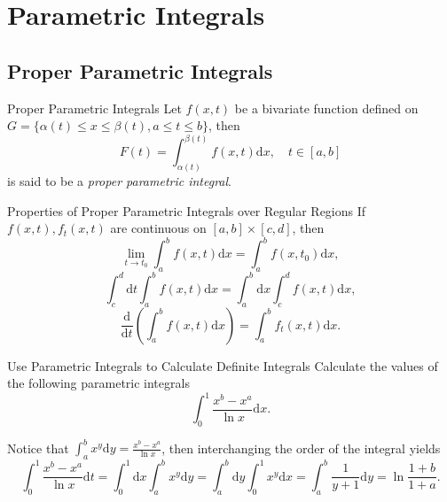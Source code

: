 
\section{Parametric Integrals}

\subsection{Proper Parametric Integrals}

\begin{definition}{Proper Parametric Integrals}{}
  Let $f(x, t)$ be a bivariate function defined on $G = \{\alpha(t) \leq x \leq
  \beta(t), a \leq t \leq b\}$,
  then
  \begin{equation}
    F(t) = \int_{\alpha(t)}^{\beta(t)} f(x, t)\mathrm{d} x, \quad t \in [a, b]
  \end{equation}
  is said to be a \emph{proper parametric integral}.
\end{definition}

\begin{proposition}{Properties of Proper Parametric Integrals over Regular Regions}{}
  If $f(x, t), f_t(x, t)$ are continuous on $[a, b] \times [c, d]$, then
  \begin{equation}
    \lim \limits _{t \rightarrow t_0} \int_a^b f(x, t)\mathrm{d} x
    = \int_a^b f(x, t_0) \mathrm{d} x,
  \end{equation}
  \begin{equation}
    \int_{c}^{d}\mathrm{d}t\int_{a}^{b}f(x,t)\mathrm{d}x=\int_{a}^{b}\mathrm{d}x\int_{c}^{d}f(x,t)\mathrm{d}x,
  \end{equation}
  \begin{equation}
    \frac{\mathrm{d}}{\mathrm{d} t} \left( \int_a^b f(x, t)\mathrm{d}x \right)
    = \int_a^b f_t(x, t)\mathrm{d} x.
  \end{equation}
\end{proposition}

\begin{example}{Use Parametric Integrals to Calculate Definite Integrals}{}
  Calculate the values of the following parametric integrals
  \begin{equation}
    \int_0^1 \frac{x^b - x^a}{\ln x}\mathrm{d} x.
  \end{equation}
\end{example}

\begin{solution}
  Notice that $\int_a^b x^y \mathrm{d} y = \frac{x^b - x^a}{\ln x}$,
  then interchanging the order of the integral yields
  \begin{equation}
    \int_0^1 \frac{x^b - x^a}{\ln x}\mathrm{d} t
    = \int_0^1 \mathrm{d} x \int_a^b x^y \mathrm{d} y
    = \int_a^b \mathrm{d} y \int_0^1 x^y \mathrm{d} x
    = \int_a^b \frac{1}{y+1}\mathrm{d} y
    = \ln \frac{1+b}{1+a}. 
  \end{equation}
\end{solution}

